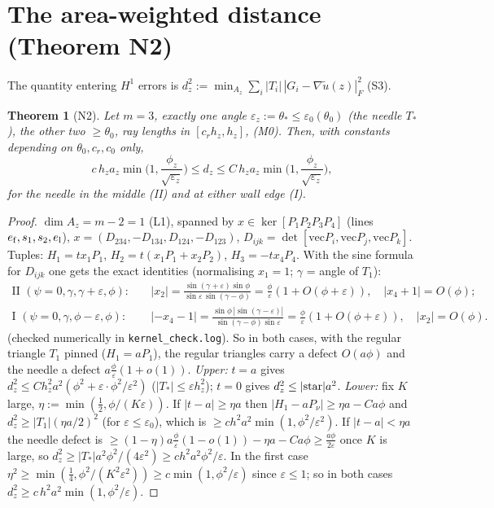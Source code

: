 \documentclass[11pt]{article}
\newtheorem{theorem}{Theorem}
\theoremstyle{remark}
\begin{document}
\section{The area-weighted distance (Theorem N2)}\label{sec:N2}
The quantity entering $H^1$ errors is $d_z^2:=\min_{A_z}\sum_i|T_i|\,|G_i-\nabla\tilde u(z)|_F^2$ (S3).
\begin{theorem}[N2]\label{thm:N2}
Let $m=3$, exactly one angle $\varepsilon_z:=\theta_*\le\varepsilon_0(\theta_0)$ (the needle $T_*$), the other two $\ge\theta_0$,
ray lengths in $[c_rh_z,h_z]$, (M0). Then, with constants depending on $\theta_0,c_r,c_0$ only,
\[
c\,h_za_z\min\Big(1,\frac{\phi_z}{\sqrt{\varepsilon_z}}\Big)\le d_z\le C\,h_za_z\min\Big(1,\frac{\phi_z}{\sqrt{\varepsilon_z}}\Big),
\]
for the needle in the middle (II) and at either wall edge (I).
\end{theorem}
\begin{proof}
$\dim A_z=m-2=1$ (L1), spanned by $x\in\ker[P_1P_2P_3P_4]$ (lines $e_{\rm f},s_1,s_2,e_{\rm l}$), $x=(D_{234},-D_{134},D_{124},-D_{123})$,
$D_{ijk}=\det[\mathrm{vec}P_i,\mathrm{vec}P_j,\mathrm{vec}P_k]$. Tuples: $H_1=tx_1P_1$, $H_2=t(x_1P_1+x_2P_2)$, $H_3=-tx_4P_4$. With the
sine formula for $D_{ijk}$ one gets the exact identities (normalising $x_1=1$; $\gamma$ = angle of $T_1$):
\begin{align*}
\text{II }(\psi=0,\gamma,\gamma+\varepsilon,\phi):&\quad |x_2|=\frac{\sin(\gamma+\varepsilon)\sin\phi}{\sin\varepsilon\,\sin(\gamma-\phi)}=\frac\phi\varepsilon(1+O(\phi+\varepsilon)),\quad |x_4+1|=O(\phi);\\
\text{I }(\psi=0,\gamma,\phi-\varepsilon,\phi):&\quad |{-x_4}-1|=\frac{\sin\phi\,|\sin(\gamma-\varepsilon)|}{\sin(\gamma-\phi)\sin\varepsilon}=\frac\phi\varepsilon(1+O(\phi+\varepsilon)),\quad |x_2|=O(\phi).
\end{align*}
(checked numerically in \texttt{kernel\_check.log}). So in both cases, with the regular triangle $T_1$ pinned ($H_1=aP_1$),
the regular triangles carry a defect $O(a\phi)$ and the needle a defect $a\frac\phi\varepsilon(1+o(1))$.
\emph{Upper:} $t=a$ gives $d_z^2\le Ch_z^2a^2(\phi^2+\varepsilon\cdot\phi^2/\varepsilon^2)$ ($|T_*|\le\varepsilon h_z^2$); $t=0$ gives
$d_z^2\le|{\rm star}|a^2$.
\emph{Lower:} fix $K$ large, $\eta:=\min(\tfrac12,\phi/(K\varepsilon))$. If $|t-a|\ge\eta a$ then $|H_1-aP_\nu|\ge\eta a-Ca\phi$ and
$d_z^2\ge|T_1|(\eta a/2)^2$ (for $\varepsilon\le\varepsilon_0$), which is $\ge c h^2a^2\min(1,\phi^2/\varepsilon^2)$. If $|t-a|<\eta a$ the needle
defect is $\ge(1-\eta)a\frac{\phi}{\varepsilon}(1-o(1))-\eta a-Ca\phi\ge\frac{a\phi}{2\varepsilon}$ once $K$ is large, so
$d_z^2\ge|T_*|a^2\phi^2/(4\varepsilon^2)\ge c h^2a^2\phi^2/\varepsilon$. In the first case $\eta^2\ge\min(\frac14,\phi^2/(K^2\varepsilon^2))
\ge c\min(1,\phi^2/\varepsilon)$ since $\varepsilon\le1$; so in both cases $d_z^2\ge c\,h^2a^2\min(1,\phi^2/\varepsilon)$.
\end{proof}
\end{document}
